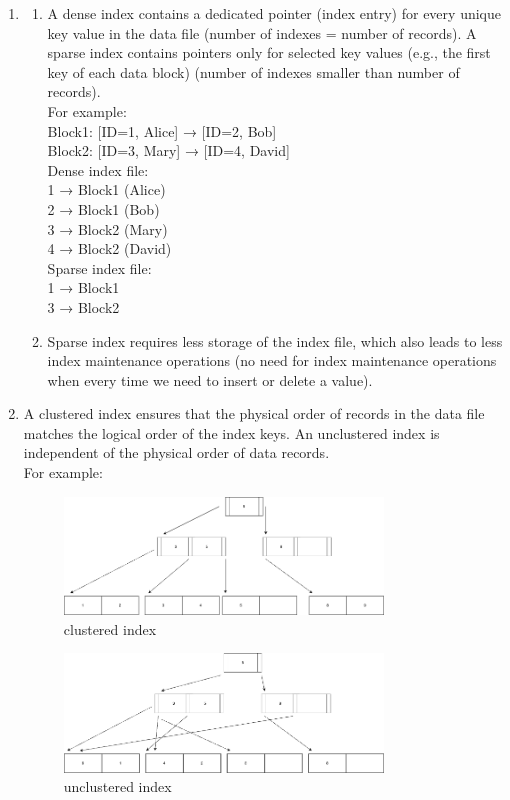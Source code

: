 \documentclass[12pt]{extarticle}
\begin{document}
\begin{flushleft}
\begin{enumerate}
\begin{enumerate}
\item
\begin{enumerate}
\item 
A dense index contains a dedicated pointer (index entry) for every unique key value in the data file (number of indexes = number of records).
A sparse index contains pointers only for selected key values (e.g., the first key of each data block) (number of indexes smaller than number of records). \\
For example: \\
Block1: [ID=1, Alice] → [ID=2, Bob] \\
Block2: [ID=3, Mary] → [ID=4, David] \\
Dense index file: \\
1 → Block1 (Alice)  \\
2 → Block1 (Bob)  \\
3 → Block2 (Mary)  \\
4 → Block2 (David)  \\
Sparse index file: \\
1 → Block1  \\
3 → Block2  \\

\item Sparse index requires less storage of the index file, which also leads to less index maintenance operations (no need for index maintenance operations when every time we need to insert or delete a value).
\end{enumerate}

\item A clustered index ensures that the physical order of records in the data file matches the logical order of the index keys.
An unclustered index is independent of the physical order of data records. \\
For example: \\
\begin{figure}[h]
  \centering
  \includegraphics[width=0.8\textwidth]{clustered.drawio.png}
  \caption{clustered index}
\end{figure}

\begin{figure}[h]
  \centering
  \includegraphics[width=0.8\textwidth]{unclustered.drawio.png}
  \caption{unclustered index}
\end{figure}


\end{enumerate}
\end{enumerate}
\end{flushleft}
\end{document}

